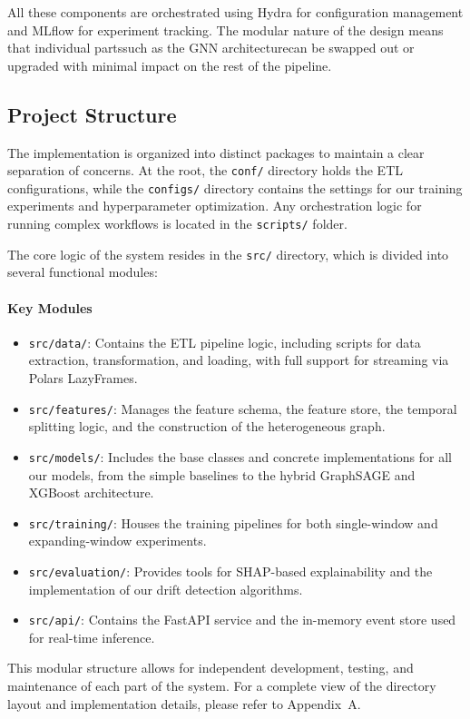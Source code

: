 All these components are orchestrated using Hydra for configuration management and MLflow for experiment tracking. The modular nature of the design means that individual partssuch as the GNN architecturecan be swapped out or upgraded with minimal impact on the rest of the pipeline.

\subsection{Project Structure}

The implementation is organized into distinct packages to maintain a clear separation of concerns. At the root, the \texttt{conf/} directory holds the ETL configurations, while the \texttt{configs/} directory contains the settings for our training experiments and hyperparameter optimization. Any orchestration logic for running complex workflows is located in the \texttt{scripts/} folder.

The core logic of the system resides in the \texttt{src/} directory, which is divided into several functional modules:

\paragraph{Key Modules}
\begin{itemize}
    \item \texttt{src/data/}: Contains the ETL pipeline logic, including scripts for data extraction, transformation, and loading, with full support for streaming via Polars LazyFrames.
    \item \texttt{src/features/}: Manages the feature schema, the feature store, the temporal splitting logic, and the construction of the heterogeneous graph.
    \item \texttt{src/models/}: Includes the base classes and concrete implementations for all our models, from the simple baselines to the hybrid GraphSAGE and XGBoost architecture.
    \item \texttt{src/training/}: Houses the training pipelines for both single-window and expanding-window experiments.
    \item \texttt{src/evaluation/}: Provides tools for SHAP-based explainability and the implementation of our drift detection algorithms.
    \item \texttt{src/api/}: Contains the FastAPI service and the in-memory event store used for real-time inference.
\end{itemize}

This modular structure allows for independent development, testing, and maintenance of each part of the system. For a complete view of the directory layout and implementation details, please refer to Appendix~A.
